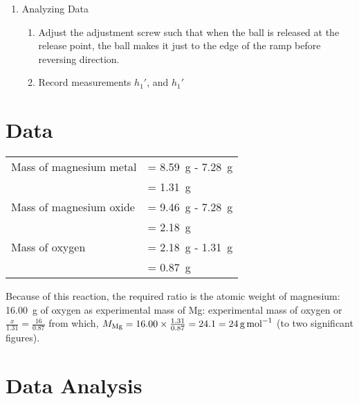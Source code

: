 \documentclass{article}
\begin{document}
\begin{enumerate}
\begin{enumerate}
        \end{enumerate}

    \item Analyzing Data
        \begin{enumerate}
            \item Adjust the adjustment screw such that when the ball is released at the release point, the ball makes it just to the edge of the ramp before reversing direction.
            \item Record measurements $h_{1}\ensuremath{'}$, and $h_{1}\ensuremath{'}$
        \end{enumerate}
\end{enumerate}
 

 \section{Data}

 \begin{tabular}{ll}
 Mass of magnesium metal & = \SI{8.59}{\gram} - \SI{7.28}{\gram}\\
 & = \SI{1.31}{\gram}\\
 Mass of magnesium oxide & = \SI{9.46}{\gram} - \SI{7.28}{\gram}\\
 & = \SI{2.18}{\gram}\\
 Mass of oxygen & = \SI{2.18}{\gram} - \SI{1.31}{\gram}\\
 & = \SI{0.87}{\gram}
 \end{tabular}

 Because of this reaction, the required ratio is the atomic weight of magnesium: \SI{16.00}{\gram} of oxygen as experimental mass of Mg: experimental mass of oxygen or $\frac{x}{1.31}=\frac{16}{0.87}$ from which, $M_{\ce{Mg}} = 16.00 \times \frac{1.31}{0.87} = 24.1 = \SI{24}{\gram\per\mole}$ (to two significant figures).


 \section{Data Analysis}
\end{document}
